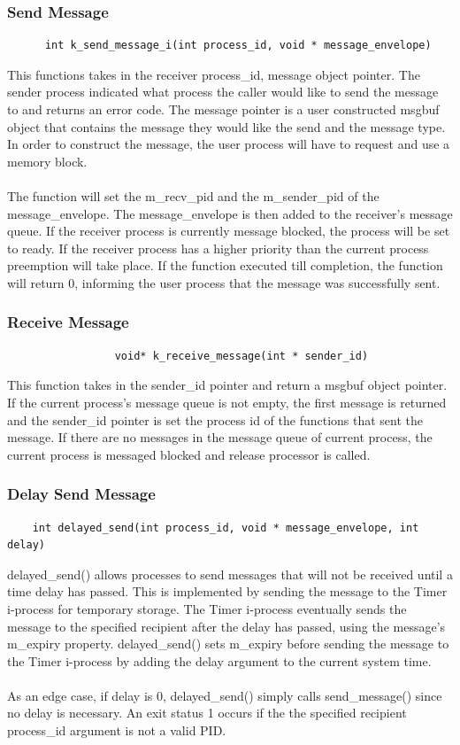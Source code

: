 \documentclass[12pt]{article}
\begin{document}
\subsubsection{Send Message}
\begin{verbatim}
      int k_send_message_i(int process_id, void * message_envelope)
\end{verbatim}
This functions takes in the receiver process\_id, message object pointer. The sender process indicated what process the caller would like to send the message to and returns an error code. The message pointer is a user constructed msgbuf object that contains the message they would like the send and the message type. In order to construct the message, the user process will have to request and use a memory block. \\ \\
The function will set the m\_recv\_pid and the m\_sender\_pid of the message\_envelope. The message\_envelope is then added to the receiver's message queue. If the receiver process is currently message blocked, the process will be set to ready. If the receiver process has a higher priority than the current process preemption will take place. If the function executed till completion, the function will return 0, informing the user process that the message was successfully sent. 
\subsubsection{Receive Message}
\begin{verbatim}
                 void* k_receive_message(int * sender_id)
\end{verbatim}
This function takes in the sender\_id pointer and return a msgbuf object pointer. If the current process’s message queue is not empty, the first message is returned and the sender\_id pointer is set the process id of the functions that sent the message. If there are no messages in the message queue of current process, the current process is messaged blocked and release processor is called. 
\subsubsection{Delay Send Message}
\begin{verbatim}
    int delayed_send(int process_id, void * message_envelope, int delay)
\end{verbatim}
delayed\_send() allows processes to send messages that will not be received until a time delay has passed. This is implemented by sending the message to the Timer i-process for temporary storage. The Timer i-process eventually sends the message to the specified recipient after the delay has passed, using the message’s m\_expiry property. delayed\_send() sets m\_expiry before sending the message to the Timer i-process by adding the delay argument to the current system time.\\ \\
As an edge case, if delay is 0, delayed\_send() simply calls send\_message() since no delay is necessary. An exit status 1 occurs if the the specified recipient process\_id argument is not a valid PID.
\end{document}
